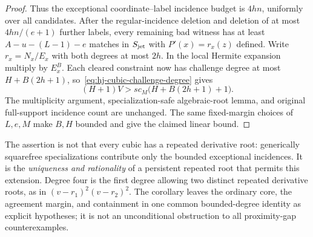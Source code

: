 \begin{proof}
Thus the exceptional coordinate--label incidence budget is $4hn$,
uniformly over all candidates.  After the regular-incidence deletion
and deletion of at most $4hn/(e+1)$ further labels, every remaining
bad witness has at least $A-u-(L-1)-e$ matches in $S_{\rm jet}$ with
$P'(x)=r_x(z)$ defined.  Write $r_x=N_x/E_x$ with both degrees at
most $2h$.  In the local Hermite expansion multiply by $E_x^B$.
Each cleared constraint now has challenge degree at most
$H+B(2h+1)$, so~\eqref{eq:hj-cubic-challenge-degree} gives
\[
 (H+1)V>sc_M\bigl(H+B(2h+1)+1\bigr).
\]
The multiplicity argument, specialization-safe algebraic-root lemma,
and original full-support incidence count are unchanged.  The same
fixed-margin choices of $L,e,M$ make $B,H$ bounded and give the
claimed linear bound.
\end{proof}

The assertion is not that every cubic has a repeated derivative root:
generically squarefree specializations contribute only the bounded
exceptional incidences.  It is the \emph{uniqueness and rationality}
of a persistent repeated root that permits this extension.  Degree
four is the first degree allowing two distinct repeated derivative
roots, as in $(v-r_1)^2(v-r_2)^2$.  The corollary leaves the ordinary
core, the agreement margin, and containment in one common bounded-degree
identity as explicit hypotheses; it is not an unconditional obstruction
to all proximity-gap counterexamples.
